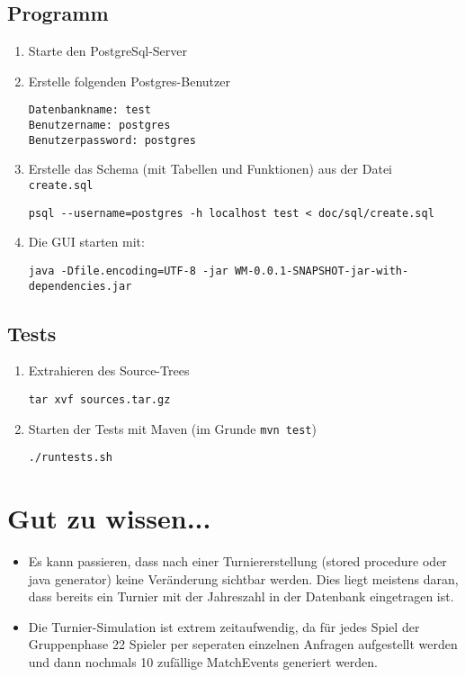 \documentclass[11pt,german]{scrartcl}
\begin{document}
\subsection*{Programm}
\begin{enumerate}
\item Starte den PostgreSql-Server
\item Erstelle folgenden Postgres-Benutzer
\begin{verbatim}Datenbankname: test
Benutzername: postgres
Benutzerpassword: postgres\end{verbatim}

\item Erstelle das Schema (mit Tabellen und Funktionen) aus der Datei {\tt create.sql}
\begin{lstlisting}
psql --username=postgres -h localhost test < doc/sql/create.sql
\end{lstlisting}

\item Die GUI starten mit:
\begin{lstlisting}
java -Dfile.encoding=UTF-8 -jar WM-0.0.1-SNAPSHOT-jar-with-dependencies.jar
\end{lstlisting}
\end{enumerate}



\subsection*{Tests}

\begin{enumerate}
\item Extrahieren des Source-Trees
\begin{lstlisting}
tar xvf sources.tar.gz
\end{lstlisting}
\item Starten der Tests mit Maven (im Grunde {\tt mvn test})
\begin{lstlisting}
./runtests.sh
\end{lstlisting}
\end{enumerate}


\section*{Gut zu wissen...}
\begin{itemize}
\item Es kann passieren, dass nach einer Turniererstellung (stored procedure oder java generator) keine Veränderung sichtbar werden.
Dies liegt meistens daran, dass bereits ein Turnier mit der Jahreszahl in der Datenbank eingetragen ist.

\item Die Turnier-Simulation ist extrem zeitaufwendig, da für jedes Spiel der Gruppenphase 22 Spieler per seperaten einzelnen Anfragen aufgestellt werden und dann nochmals 10 zufällige MatchEvents generiert werden.

\end{itemize}
\end{document}
